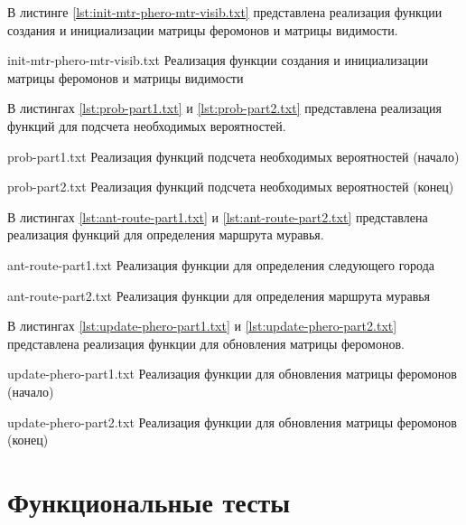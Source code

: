 В листинге \ref{lst:init-mtr-phero-mtr-visib.txt} представлена реализация функции создания и инициализации матрицы феромонов и матрицы видимости.

{init-mtr-phero-mtr-visib.txt} %
{Реализация функции создания и инициализации матрицы феромонов и матрицы видимости} %

В листингах \ref{lst:prob-part1.txt} и \ref{lst:prob-part2.txt} представлена реализация функций для подсчета необходимых вероятностей.

{prob-part1.txt} %
{Реализация функций подсчета необходимых вероятностей (начало)} %

{prob-part2.txt} %
{Реализация функций подсчета необходимых вероятностей (конец)} %

В листингах \ref{lst:ant-route-part1.txt} и \ref{lst:ant-route-part2.txt} представлена реализация функций для определения маршрута муравья.

{ant-route-part1.txt} %
{Реализация функции для определения следующего города} %

\clearpage

{ant-route-part2.txt} %
{Реализация функции для определения маршрута муравья} %

В листингах \ref{lst:update-phero-part1.txt} и \ref{lst:update-phero-part2.txt} представлена реализация функции для обновления матрицы феромонов.

{update-phero-part1.txt} %
{Реализация функции для обновления матрицы феромонов (начало)} %

{update-phero-part2.txt} %
{Реализация функции для обновления матрицы феромонов (конец)} %

\section{Функциональные тесты}


